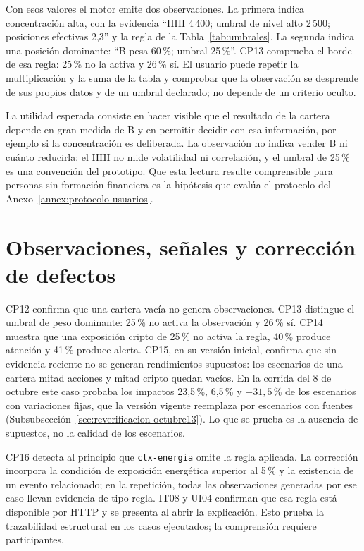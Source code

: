 Con esos valores el motor emite dos observaciones. La primera indica concentración alta, con la evidencia \enquote{HHI 4\,400; umbral de nivel alto 2\,500; posiciones efectivas 2,3} y la regla de la Tabla~\ref{tab:umbrales}. La segunda indica una posición dominante: \enquote{B pesa 60\,\%; umbral 25\,\%}. CP13 comprueba el borde de esa regla: 25\,\% no la activa y 26\,\% sí. El usuario puede repetir la multiplicación y la suma de la tabla y comprobar que la observación se desprende de sus propios datos y de un umbral declarado; no depende de un criterio oculto.

La utilidad esperada consiste en hacer visible que el resultado de la cartera depende en gran medida de B y en permitir decidir con esa información, por ejemplo si la concentración es deliberada. La observación no indica vender B ni cuánto reducirla: el HHI no mide volatilidad ni correlación, y el umbral de 25\,\% es una convención del prototipo. Que esta lectura resulte comprensible para personas sin formación financiera es la hipótesis que evalúa el protocolo del Anexo~\ref{annex:protocolo-usuarios}.

\section{Observaciones, señales y corrección de defectos}\label{sec:pruebas-observaciones}

CP12 confirma que una cartera vacía no genera observaciones. CP13 distingue el umbral de peso dominante: 25\,\% no activa la observación y 26\,\% sí. CP14 muestra que una exposición cripto de 25\,\% no activa la regla, 40\,\% produce atención y 41\,\% produce alerta. CP15, en su versión inicial, confirma que sin evidencia reciente no se generan rendimientos supuestos: los escenarios de una cartera mitad acciones y mitad cripto quedan vacíos. En la corrida del 8 de octubre este caso probaba los impactos 23,5\,\%, 6,5\,\% y $-31{,}5$\,\% de los escenarios con variaciones fijas, que la versión vigente reemplaza por escenarios con fuentes (Subsubsección~\ref{sec:reverificacion-octubre13}). Lo que se prueba es la ausencia de supuestos, no la calidad de los escenarios.

CP16 detecta al principio que \texttt{ctx-energia} omite la regla aplicada. La corrección incorpora la condición de exposición energética superior al 5\,\% y la existencia de un evento relacionado; en la repetición, todas las observaciones generadas por ese caso llevan evidencia de tipo regla. IT08 y UI04 confirman que esa regla está disponible por HTTP y se presenta al abrir la explicación. Esto prueba la trazabilidad estructural en los casos ejecutados; la comprensión requiere participantes.

